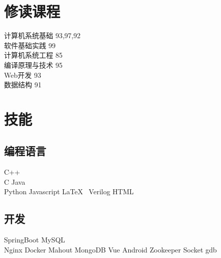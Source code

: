 \documentclass[]{deedy-resume-openfont}
\begin{document}
\begin{minipage}[t]{0.25\textwidth}
\section{修读课程}
\sectionsep
计算机系统基础 93,97,92 \\
软件基础实践 99\\
计算机系统工程 85 \\
编译原理与技术 95 \\
Web开发 93 \\
数据结构 91 \\
 \sectionsep
 \sectionsep

\section{技能}
\sectionsep
\subsection{编程语言}
C++ \\
C \textbullet{} Java \\
Python \textbullet{} Javascript \textbullet{} \LaTeX\ \textbullet{} Verilog \textbullet{} HTML \\ 
\sectionsep

\subsection{开发}
SpringBoot  \textbullet{} MySQL \\
Nginx \textbullet{} Docker \textbullet{} Mahout \textbullet{} MongoDB \textbullet{} Vue \textbullet{} Android \textbullet{} Zookeeper \textbullet{} Socket \textbullet{} gdb\\


%
%

\end{minipage} 
\hfill
\end{document}
